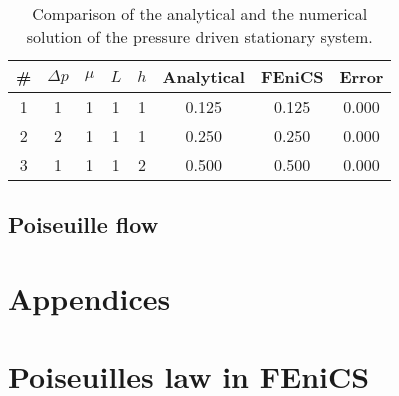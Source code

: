 \documentclass[a4paper,10pt]{article}
\renewcommand{\(}{\left(}
\renewcommand{\)}{\right)}
\begin{document}
\begin{table}[h!]
  \begin{center}
    \begin{tabular}[width=4in]{|c|c|c|c|c|c|c|c|}
      \hline
      \# & $\Delta p$ & $\mu$ & $L$ & $h$ & Analytical & FEniCS & Error\\ \hline
      1 & 1 & 1 & 1 & 1 & 0.125 & 0.125 & 0.000\\
      2 & 2 & 1 & 1 & 1 & 0.250 & 0.250 & 0.000\\
      3 & 1 & 1 & 1 & 2 & 0.500 & 0.500 & 0.000\\
      \hline
    \end{tabular}
  \caption{Comparison of the analytical and the numerical solution of the pressure driven stationary system.}
  \label{tab:res_hagen_poiseuille}
  \end{center}
\end{table}
\subsection{Poiseuille flow}



\section{Appendices}
\appendix
\section{Poiseuilles law in FEniCS}
\label{ap:a}


\printbibliography
\end{document}
